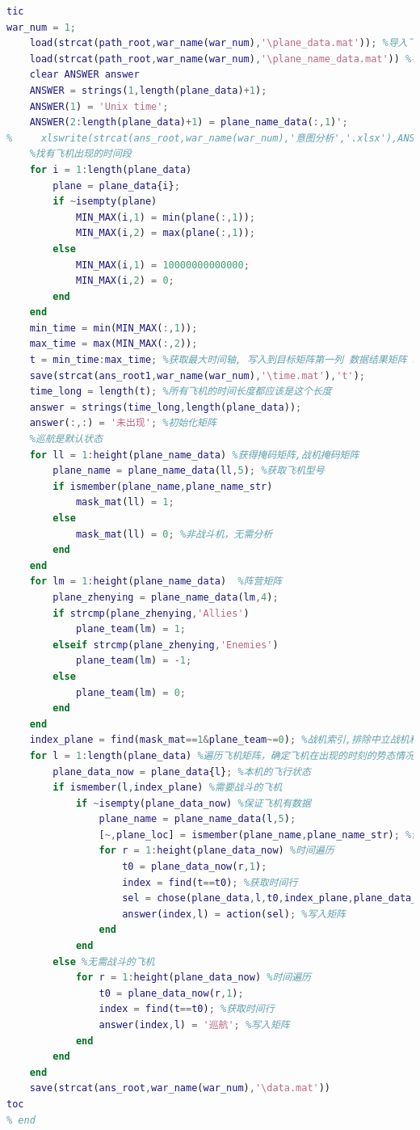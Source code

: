 \documentclass{my_paper}
\begin{document}
\begin{lstlisting}[language=matlab]
% for war_num = 1:10
tic
war_num = 1;
    load(strcat(path_root,war_name(war_num),'\plane_data.mat')); %导入飞机飞行信息  需要提取时间轴 
    load(strcat(path_root,war_name(war_num),'\plane_name_data.mat')) %导入飞机信息 飞机id在 1 
    clear ANSWER answer
    ANSWER = strings(1,length(plane_data)+1);
    ANSWER(1) = 'Unix time';
    ANSWER(2:length(plane_data)+1) = plane_name_data(:,1)';
%     xlswrite(strcat(ans_root,war_name(war_num),'意图分析','.xlsx'),ANSWER,'sheet1','A1'); %写入标题
    %找有飞机出现的时间段
    for i = 1:length(plane_data)
        plane = plane_data{i};
        if ~isempty(plane)
            MIN_MAX(i,1) = min(plane(:,1));
            MIN_MAX(i,2) = max(plane(:,1));
        else
            MIN_MAX(i,1) = 10000000000000;
            MIN_MAX(i,2) = 0;
        end
    end
    min_time = min(MIN_MAX(:,1));
    max_time = max(MIN_MAX(:,2));
    t = min_time:max_time; %获取最大时间轴, 写入到目标矩阵第一列 数据结果矩阵 和最终矩阵相差一行
    save(strcat(ans_root1,war_name(war_num),'\time.mat'),'t');
    time_long = length(t); %所有飞机的时间长度都应该是这个长度
    answer = strings(time_long,length(plane_data));
    answer(:,:) = '未出现'; %初始化矩阵
    %巡航是默认状态
    for ll = 1:height(plane_name_data) %获得掩码矩阵,战机掩码矩阵
        plane_name = plane_name_data(ll,5); %获取飞机型号
        if ismember(plane_name,plane_name_str)
            mask_mat(ll) = 1;
        else
            mask_mat(ll) = 0; %非战斗机，无需分析
        end
    end
    for lm = 1:height(plane_name_data)  %阵营矩阵
        plane_zhenying = plane_name_data(lm,4);
        if strcmp(plane_zhenying,'Allies')
            plane_team(lm) = 1;
        elseif strcmp(plane_zhenying,'Enemies')
            plane_team(lm) = -1;
        else
            plane_team(lm) = 0; 
        end
    end
    index_plane = find(mask_mat==1&plane_team~=0); %战机索引,排除中立战机和非战斗飞机
    for l = 1:length(plane_data) %遍历飞机矩阵，确定飞机在出现的时刻的势态情况
        plane_data_now = plane_data{l}; %本机的飞行状态
        if ismember(l,index_plane) %需要战斗的飞机
            if ~isempty(plane_data_now) %保证飞机有数据
                plane_name = plane_name_data(l,5);
                [~,plane_loc] = ismember(plane_name,plane_name_str); %价值函数分析索引
                for r = 1:height(plane_data_now) %时间遍历
                    t0 = plane_data_now(r,1);
                    index = find(t==t0); %获取时间行
                    sel = chose(plane_data,l,t0,index_plane,plane_data_now(r,:),plane_loc,plane_team,plane_name_data(:,5),plane_name_str,war_num);
                    answer(index,l) = action(sel); %写入矩阵
                end
            end
        else %无需战斗的飞机
            for r = 1:height(plane_data_now) %时间遍历    
                t0 = plane_data_now(r,1);
                index = find(t==t0); %获取时间行
                answer(index,l) = '巡航'; %写入矩阵
            end
        end
    end
    save(strcat(ans_root,war_name(war_num),'\data.mat'))
toc
% end




\end{lstlisting}
\end{document}
